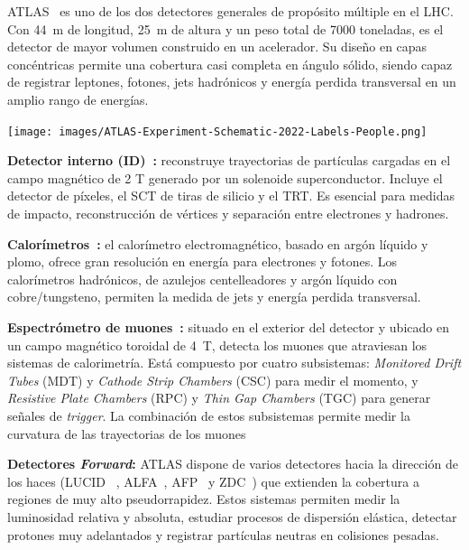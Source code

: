 ATLAS~\cite{ATLAS:exp,ATLAS_run3} es uno de los dos detectores generales de propósito múltiple en el LHC. Con 44~m de longitud, 25~m de altura y un peso total de 7000 toneladas, es el detector de mayor volumen construido en un acelerador. Su diseño en capas concéntricas permite una cobertura casi completa en ángulo sólido, siendo capaz de registrar leptones, fotones, jets hadrónicos y energía perdida transversal en un amplio rango de energías.

\begin{center}
  \texttt{[image: images/ATLAS-Experiment-Schematic-2022-Labels-People.png]}
  \end{center}

\textbf{Detector interno (ID)~\cite{2010_id,ATLAS:exp}:} reconstruye trayectorias de partículas cargadas en el campo magnético de 2 T generado por un solenoide superconductor. Incluye el detector de píxeles, el SCT de tiras de silicio y el TRT. Es esencial para medidas de impacto, reconstrucción de vértices y separación entre electrones y hadrones.  

\textbf{Calorímetros~\cite{2010_lar,2010_tile}:} el calorímetro electromagnético, basado en argón líquido y plomo, ofrece gran resolución en energía para electrones y fotones. Los calorímetros hadrónicos, de azulejos centelleadores y argón líquido con cobre/tungsteno, permiten la medida de jets y energía perdida transversal.  

\textbf{Espectrómetro de muones~\cite{muon_com}:} situado en el exterior del detector y
ubicado en un campo magnético toroidal de 4~T, detecta los muones que atraviesan los
sistemas de calorimetría. Está compuesto por cuatro subsistemas:
\textit{Monitored Drift Tubes} (MDT) y \textit{Cathode Strip Chambers} (CSC) para medir el momento,
y \textit{Resistive Plate Chambers} (RPC) y \textit{Thin Gap Chambers} (TGC) para generar señales de \textit{trigger}.
La combinación de estos subsistemas permite medir la curvatura de las trayectorias de los muones

\textbf{Detectores \textit{Forward}:} ATLAS dispone de varios detectores hacia la dirección de los haces (LUCID~\cite{Jenni:721908} , ALFA~\cite{Khalek_2016}, AFP~\cite{Adamczyk:2015cjy} y ZDC~\cite{Jenni:1009649}) que extienden la cobertura a regiones de muy alto pseudorrapidez. Estos sistemas permiten medir la luminosidad relativa y absoluta, estudiar procesos de dispersión elástica, detectar protones muy adelantados y registrar partículas neutras en colisiones pesadas.

